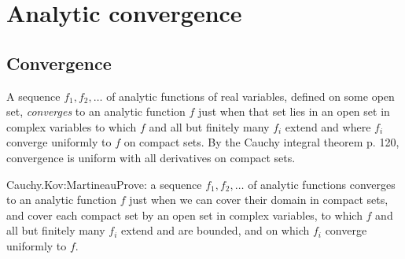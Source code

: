 \chapter{Analytic convergence}
\section{Convergence}\label{section:convergence}
A sequence \(f_1,f_2,\dots\) of analytic functions of real variables, defined on some open set, \emph{converges} to an analytic function \(f\) just when that set lies in an open set in complex variables to which \(f\) and all but finitely many \(f_i\) extend and where \(f_i\) converge uniformly to \(f\) on compact sets.
By the Cauchy integral theorem \cite{Ahlfors:1978} p. 120, convergence is uniform with all derivatives on compact sets.
\begin{problem}{Cauchy.Kov:Martineau}Prove: a sequence \(f_1,f_2,\dots\) of analytic functions converges to an analytic function \(f\) just when we can cover their domain in compact sets, and cover each compact set by an open set in complex variables, to which \(f\) and all but finitely many \(f_i\) extend and are bounded, and on which \(f_i\) converge uniformly to \(f\).
\end{problem}

